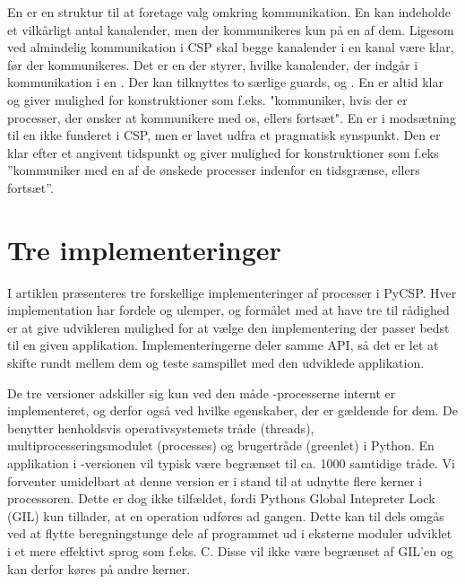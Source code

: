 En  er en struktur til at foretage valg omkring kommunikation. En  kan indeholde et vilkårligt antal kanalender, men der kommunikeres kun på en af dem. Ligesom ved almindelig kommunikation i CSP skal begge kanalender i en kanal være klar, før der kommunikeres. Det er en   der styrer, hvilke kanalender, der indgår i kommunikation i en . Der kan tilknyttes to særlige guards,  og . En  er altid klar og giver mulighed for konstruktioner som f.eks. "kommuniker, hvis der er processer, der ønsker at kommunikere med os, ellers fortsæt". En  er i modsætning til en  ikke funderet i CSP, men er lavet udfra et pragmatisk synspunkt. Den er klar efter et angivent tidspunkt og giver mulighed for konstruktioner som f.eks ''kommuniker med en af de ønskede processer indenfor en tidsgrænse, ellers fortsæt''. 

\section{Tre implementeringer}
I artiklen \cite{Friborg2009} præsenteres tre forskellige implementeringer af processer i PyCSP. Hver implementation har fordele og ulemper, og formålet med at have tre til rådighed er at give udvikleren mulighed for at vælge den implementering der passer bedst til en given applikation. Implementeringerne deler samme API, så det er let at skifte rundt mellem dem og teste samspillet med den udviklede applikation. 

De tre versioner adskiller sig kun ved den måde \csp-processerne internt er implementeret, og derfor også ved hvilke egenskaber, der er gældende for dem. De benytter henholdsvis operativsystemets tråde (threads), multiprocesseringsmodulet (processes) og brugertråde (greenlet) i Python. En applikation i -versionen vil typisk være begrænset til ca. 1000 samtidige tråde\cite[3]{Friborg2009}. Vi forventer umidelbart at denne version er i stand til at udnytte flere kerner i processoren. Dette er dog ikke tilfældet, fordi Pythons Global Intepreter Lock (GIL) kun tillader, at en operation udføres ad gangen. Dette kan til dels omgås ved at flytte beregningstunge dele af programmet ud i eksterne moduler udviklet i et mere effektivt sprog som f.eks. C. Disse vil ikke være begrænset af GIL'en og kan derfor køres på andre kerner. 

